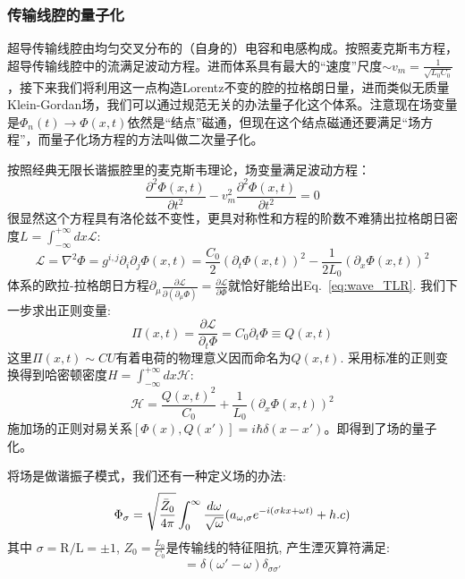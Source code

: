 \documentclass[supercite]{HustGraduPaper}
\begin{document}
   	\subsubsection{传输线腔的量子化}
   	超导传输线腔由均匀交叉分布的（自身的）电容和电感构成。按照麦克斯韦方程，超导传输线腔中的流满足波动方程。进而体系具有最大的“速度”尺度$\sim v_m = \frac{1}{\sqrt{L_0 C_0}}$，接下来我们将利用这一点构造Lorentz不变的腔的拉格朗日量，进而类似无质量Klein-Gordan场，我们可以通过规范无关的办法量子化这个体系。注意现在场变量是$\Phi_n(t)\to \Phi(x,t)$依然是“结点”磁通，但现在这个结点磁通还要满足“场方程”，而量子化场方程的方法叫做二次量子化。
   	
   	按照经典无限长谐振腔里的麦克斯韦理论，场变量满足波动方程：
\begin{equation}
\label{eq:wave_TLR}
\frac{\partial^2 \Phi(x,t)}{\partial t^2} - v^2_m \frac{\partial^2 \Phi(x,t)}{\partial t^2} = 0
\end{equation}
很显然这个方程具有洛伦兹不变性，更具对称性和方程的阶数不难猜出拉格朗日密度$L = \int_{-\infty}^{+\infty} dx \mathcal{L}$:
\begin{equation}
\mathcal{L} = \nabla^2 \Phi = g^{i,j} \partial_i \partial_j \Phi(x,t) = \frac{C_0}{2}(\partial_t \Phi(x,t))^2 - \frac{1}{2L_0} (\partial_x \Phi(x,t))^2
\end{equation}
体系的欧拉-拉格朗日方程$\partial_\mu \frac{\partial \mathcal{L}}{\partial(\partial_\mu \Phi)} = \frac{\partial\mathcal{L}}{\partial\Phi}$就恰好能给出Eq.~\ref{eq:wave_TLR}. 我们下一步求出正则变量:
\begin{equation}
\Pi(x,t) = \frac{\partial \mathcal{L}}{\partial_t \Phi} = C_0 \partial_t \Phi \equiv Q(x,t)
\end{equation}
这里$\Pi(x,t) \sim CU$有着电荷的物理意义因而命名为$Q(x,t)$. 采用标准的正则变换得到哈密顿密度$H = \int_{-\infty}^{+\infty} dx \mathcal{H}$:
\begin{equation}
\mathcal{H} = \frac{Q(x,t)^2}{C_0} + \frac{1}{L_0}(\partial_x \Phi(x,t))^2
\end{equation}
施加场的正则对易关系$[\Phi(x),Q(x')] = i\hbar \delta(x-x')$。即得到了场的量子化。

将场是做谐振子模式，我们还有一种定义场的办法:
\begin{equation}
\Phi_\sigma = \sqrt{\bar Z_0 \over{4\pi}} \int_{0}^{\infty} \frac{d\omega}{\sqrt{\omega}}(a_{\omega,\sigma}e^{-i(\sigma kx+\omega t)}+h.c)
\end{equation}
其中 $\sigma = \text{R/L} = \pm 1$, $Z_0 = \frac{L_0}{C_0}$是传输线的特征阻抗, 产生湮灭算符满足:
\begin{equation}
[a_{\omega,\sigma}, a^\dagger_{\omega',\sigma'}] = \delta(\omega' - \omega) \delta_{\sigma \sigma'}
\end{equation}
\end{document}
